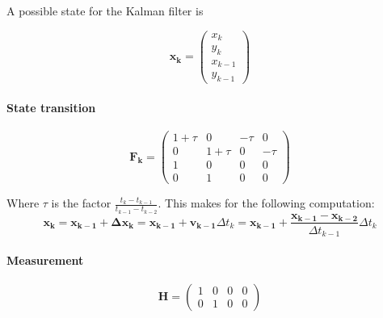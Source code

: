 \documentclass[a4paper, 12pt]{paper}
\begin{document}
A possible state for the Kalman filter is

\begin{equation}
    \mathbf{x_k} = \left( \begin{array}{c} x_k     \\
                                           y_k     \\
                                           x_{k-1} \\
                                           y_{k-1} \end{array} \right)
\label{eq:kalman_state}
\end{equation}

\paragraph{State transition}

\begin{equation}
    \mathbf{F_k} = \left( \begin{array}{cccc} 1 + \tau & 0 & -\tau & 0\\
                                              0 & 1 + \tau & 0 & -\tau\\
                                              1 & 0 & 0 & 0 \\
                                              0 & 1 & 0 & 0 \end{array} \right)
\label{eq:state_trans}
\end{equation}

Where $\tau$ is the factor $ \frac{t_k - t_{k-1}}{t_{k-1} - t_{k-2}}$.
This makes for the following computation:
\begin{equation}
    \mathbf{x_k} = \mathbf{x_{k-1}} + \mathbf{\Delta x_k}
    = \mathbf{x_{k-1}} + \mathbf{v_{k-1}} \Delta t_k
    = \mathbf{x_{k-1}} + \frac{\mathbf{x_{k-1}} - \mathbf{x_{k-2}}}
                              {\Delta t_{k-1}} \Delta t_k
\label{eq:state_trans_math}
\end{equation}

\paragraph{Measurement}

\begin{equation}
    \mathbf{H} = \left( \begin{array}{cccc} 1 & 0 & 0 & 0\\
                                            0 & 1 & 0 & 0 \end{array} \right)
\label{eq:h}
\end{equation}
\end{document}
